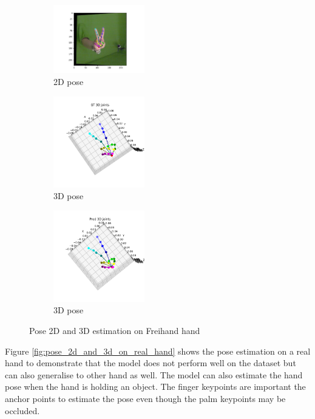 \begin{figure}[ht]
    \begin{center}
        \begin{subfigure}[b]{0.32\textwidth}
            \includegraphics[width=150px]{assets/freihand_2d.png}
            \caption{2D pose}
            \label{fig:freihand_hand_2d}
        \end{subfigure}
        \begin{subfigure}[b]{0.32\textwidth}
            \includegraphics[width=150px]{assets/freihand_3d_gt.png}
            \caption{3D pose}
            \label{fig:freihand_hand_3d_gt}
        \end{subfigure}
        \begin{subfigure}[b]{0.32\textwidth}
            \includegraphics[width=150px]{assets/freihand_3d_pred.png}
            \caption{3D pose}
            \label{fig:freihand_hand_3d_pred}
        \end{subfigure}
	    \caption{Pose 2D and 3D estimation on Freihand hand}
	    \label{fig:pose_2d_and_3d_on_freihand_hand}        
    \end{center}
\end{figure}

\noindent
Figure \ref{fig:pose_2d_and_3d_on_real_hand} shows the pose estimation on a real hand to demonstrate that the model does not perform well on the dataset but can also generalise to other hand as well. The model can also estimate the hand pose when the hand is holding an object. The finger keypoints are important the anchor points to estimate the pose even though the palm keypoints may be occluded.

